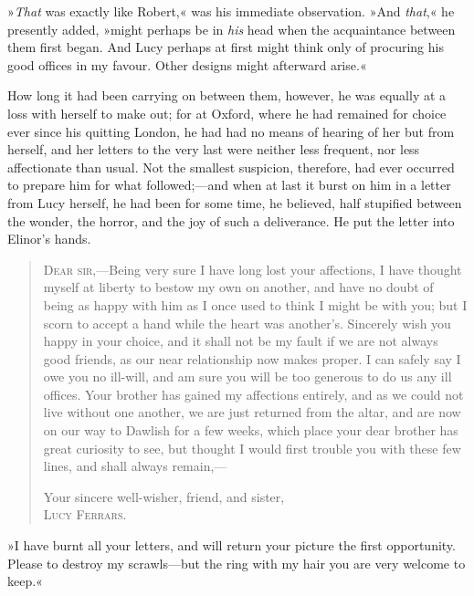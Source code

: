 »\textit{That} was exactly like Robert,« was his immediate observation. »And \textit{that},« he presently added, »might perhaps be in \textit{his} head when the acquaintance between them first began. And Lucy perhaps at first might think only of procuring his good offices in my favour. Other designs might afterward arise.«

How long it had been carrying on between them, however, he was equally at a loss with herself to make out; for at Oxford, where he had remained for choice ever since his quitting London, he had had no means of hearing of her but from herself, and her letters to the very last were neither less frequent, nor less affectionate than usual. Not the smallest suspicion, therefore, had ever occurred to prepare him for what followed;—and when at last it burst on him in a letter from Lucy herself, he had been for some time, he believed, half stupified between the wonder, the horror, and the joy of such a deliverance. He put the letter into Elinor’s hands.


\begin{quotation}
\noindent\textsc{Dear sir},—Being very sure I have long lost your affections, I have thought myself at liberty to bestow my own on another, and have no doubt of being as happy with him as I once used to think I might be with you; but I scorn to accept a hand while the heart was another’s. Sincerely wish you happy in your choice, and it shall not be my fault if we are not always good friends, as our near relationship now makes proper. I can safely say I owe you no ill-will, and am sure you will be too generous to do us any ill offices. Your brother has gained my affections entirely, and as we could not live without one another, we are just returned from the altar, and are now on our way to Dawlish for a few weeks, which place your dear brother has great curiosity to see, but thought I would first trouble you with these few lines, and shall always remain,—

\begin{flushright}
	\noindent Your sincere well-wisher, friend, and sister,\\
\textsc{Lucy Ferrars}.
\end{flushright}
\end{quotation}



»I have burnt all your letters, and will return your picture the first opportunity. Please to destroy my scrawls—but the ring with my hair you are very welcome to keep.«

